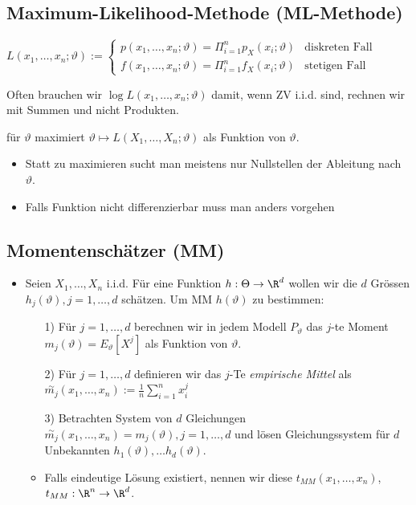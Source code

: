 \subsection{Maximum-Likelihood-Methode (ML-Methode)}
\begin{itemize}
     $L(x_1, \dots, x_n; \vartheta) :=
\begin{cases}
    p(x_1, \dots, x_n; \vartheta) = \Pi_{i = 1}^n p_X(x_i; \vartheta) &\text{diskreten Fall}\\
    f(x_1, \dots, x_n; \vartheta) = \Pi_{i = 1}^n f_X(x_i; \vartheta) &\text{stetigen Fall}
\end{cases}$
        \begin{itemize}
             Often brauchen wir $\log L(x_1, \dots, x_n;\vartheta)$ damit, wenn ZV i.i.d. sind, rechnen wir mit Summen und nicht Produkten.
        \end{itemize}
         für $\vartheta$ maximiert $\vartheta \mapsto L(X_1, \dots, X_n;\vartheta)$ als Funktion von $\vartheta$.
        \begin{itemize}
            \item Statt zu maximieren sucht man meistens nur Nullstellen der Ableitung nach $\vartheta$.
            \item Falls Funktion nicht differenzierbar muss man anders vorgehen
        \end{itemize}
\end{itemize}

\subsection{Momentenschätzer (MM)}
\begin{itemize}
    \item Seien $X_1, \dots, X_n$ i.i.d. Für eine Funktion $h: \Theta \to \R^d$ wollen wir die $d$ Grössen $h_j(\vartheta), j = 1, \dots, d$ schätzen. Um MM $h(\vartheta)$ zu bestimmen:
    \begin{itemize}
        \item[1)] Für $j = 1, \dots, d$ berechnen wir in jedem Modell $P_\vartheta$ das $j$-te Moment $m_j(\vartheta) = E_\vartheta[X^j]$ als Funktion von $\vartheta$.
        \item[2)] Für $j = 1, \dots, d$ definieren wir das $j$-Te \textit{empirische Mittel} als $\overset{\sim}{m_j}(x_1, \dots, x_n) := \frac{1}{n} \sum_{i=1}^{n} x_i^j$
        \item[3)] Betrachten System von $d$ Gleichungen $\overset{\sim}{m_j}(x_1, \dots, x_n) = m_j(\vartheta), j = 1, \dots, d$ und lösen Gleichungssystem für $d$ Unbekannten $h_1(\vartheta), \dots h_d(\vartheta)$.
        \item Falls eindeutige Lösung existiert, nennen wir diese $t_{MM}(x_1, \dots, x_n)$, $t_{MM}: \R^n \to \R^d$.
    \end{itemize}
\end{itemize}

